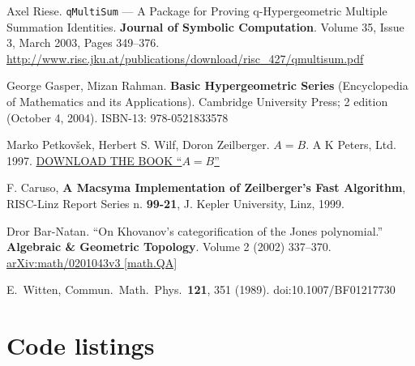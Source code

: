 \documentclass[10pt]{amsart}
\begin{document}
\begin{thebibliography}{9}
Axel Riese.  \verb|qMultiSum| — A Package for Proving q-Hypergeometric Multiple Summation Identities. \textbf{Journal of Symbolic Computation}. Volume 35, Issue 3, March 2003, Pages 349–376.  \url{http://www.risc.jku.at/publications/download/risc_427/qmultisum.pdf}

George Gasper, Mizan Rahman.  \textbf{Basic Hypergeometric Series} (Encyclopedia of Mathematics and its Applications).  Cambridge University Press; 2 edition (October 4, 2004). ISBN-13: 978-0521833578

Marko Petkov\v{s}ek, Herbert S. Wilf, Doron Zeilberger. \textbf{$A=B$}.  A K Peters, Ltd. 1997. \href{https://www.math.upenn.edu/~wilf/Downld.html}{DOWNLOAD THE BOOK ``$A=B$''}
 
F. Caruso, \textbf{A Macsyma Implementation of Zeilberger's Fast Algorithm}, RISC-Linz Report Series n. \textbf{99-21}, J. Kepler University, Linz, 1999.

Dror Bar-Natan. ``On Khovanov’s categorification of the Jones polynomial.'' \textbf{Algebraic \& Geometric Topology}.  Volume 2 (2002) 337–370.  \href{http://arxiv.org/abs/math/0201043}{arXiv:math/0201043v3 [math.QA]}

  E.~Witten,
  Commun.\ Math.\ Phys.\  {\bf 121}, 351 (1989).
  doi:10.1007/BF01217730



\end{thebibliography}




\clearpage
\onecolumn

\section{Code listings}

\lstlistoflistings
\end{document}
